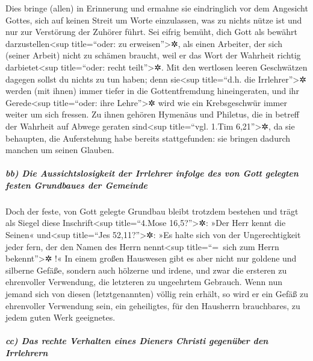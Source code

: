  Dies bringe (allen) in Erinnerung und ermahne sie
eindringlich vor dem Angesicht Gottes, sich auf keinen Streit um Worte
einzulassen, was zu nichts nütze ist und nur zur Verstörung der Zuhörer
führt.  Sei eifrig bemüht, dich Gott als bewährt
darzustellen\textless sup title=``oder: zu erweisen''\textgreater✲, als
einen Arbeiter, der sich (seiner Arbeit) nicht zu schämen braucht, weil
er das Wort der Wahrheit richtig darbietet\textless sup title=``oder:
recht teilt''\textgreater✲.  Mit den wertlosen leeren
Geschwätzen dagegen sollst du nichts zu tun haben; denn sie\textless sup
title=``d.h. die Irrlehrer''\textgreater✲ werden (mit ihnen) immer
tiefer in die Gottentfremdung hineingeraten,  und ihr
Gerede\textless sup title=``oder: ihre Lehre''\textgreater✲ wird wie ein
Krebsgeschwür immer weiter um sich fressen. Zu ihnen gehören Hymenäus
und Philetus,  die in betreff der Wahrheit auf Abwege
geraten sind\textless sup title=``vgl. 1.Tim 6,21''\textgreater✲, da sie
behaupten, die Auferstehung habe bereits stattgefunden: sie bringen
dadurch manchen um seinen Glauben.

\hypertarget{bb-die-aussichtslosigkeit-der-irrlehrer-infolge-des-von-gott-gelegten-festen-grundbaues-der-gemeinde}{%
\subparagraph{bb) Die Aussichtslosigkeit der Irrlehrer infolge des von
Gott gelegten festen Grundbaues der
Gemeinde}\label{bb-die-aussichtslosigkeit-der-irrlehrer-infolge-des-von-gott-gelegten-festen-grundbaues-der-gemeinde}}

 Doch der feste, von Gott gelegte Grundbau bleibt
trotzdem bestehen und trägt als Siegel diese Inschrift\textless sup
title=``4.Mose 16,5?''\textgreater✲: »Der Herr kennt die Seinen«
und\textless sup title=``Jes 52,11?''\textgreater✲: »Es halte sich von
der Ungerechtigkeit jeder fern, der den Namen des Herrn
nennt\textless sup title=``=~sich zum Herrn bekennt''\textgreater✲ !«
 In einem großen Hauswesen gibt es aber nicht nur goldene
und silberne Gefäße, sondern auch hölzerne und irdene, und zwar die
ersteren zu ehrenvoller Verwendung, die letzteren zu ungeehrtem
Gebrauch.  Wenn nun jemand sich von diesen
(letztgenannten) völlig rein erhält, so wird er ein Gefäß zu ehrenvoller
Verwendung sein, ein geheiligtes, für den Hausherrn brauchbares, zu
jedem guten Werk geeignetes.

\hypertarget{cc-das-rechte-verhalten-eines-dieners-christi-gegenuxfcber-den-irrlehrern}{%
\subparagraph{cc) Das rechte Verhalten eines Dieners Christi gegenüber
den
Irrlehrern}\label{cc-das-rechte-verhalten-eines-dieners-christi-gegenuxfcber-den-irrlehrern}}

